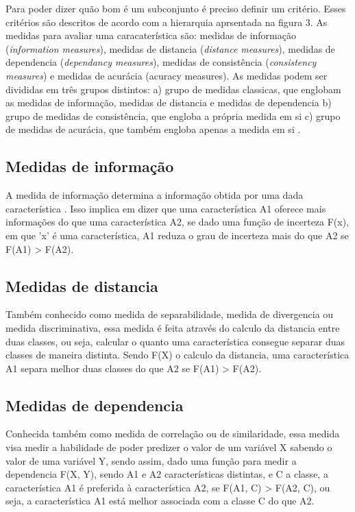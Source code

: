 Para poder dizer quão bom é um subconjunto é preciso definir um critério. Esses critérios são descritos de acordo com a hierarquia aprsentada na figura 3. As medidas para avaliar uma caracaterística são: medidas de informação (\textit{information measures}), medidas de distancia (\textit{distance measures}), medidas de dependencia (\textit{dependancy measures}), medidas de consistência (\textit{consistency measures}) e medidas de acurácia ({acuracy measures}). \cite{liu_2005, huan_1998} As medidas podem ser divididas em três grupos distintos: a) grupo de medidas classicas, que englobam as medidas de informação, medidas de distancia e medidas de dependencia b) grupo de medidas de consistência, que engloba a própria medida em si c) grupo de medidas de acurácia, que também engloba apenas a medida em si \cite{huan_1998}.

\subsection{Medidas de informação}

A medida de informação determina a informação obtida por uma dada característica \cite{liu_2005}. Isso implica em dizer que uma característica A1 oferece mais informações do que uma característica A2, se dado uma função de incerteza F(x), em que 'x' é uma característica, A1 reduza o grau de incerteza mais do que A2 se F(A1) > F(A2).

\subsection{Medidas de distancia}

Também conhecido como medida de separabilidade, medida de divergencia ou medida discriminativa, essa medida é feita através do calculo da distancia entre duas classes, ou seja, calcular o quanto uma característica consegue  separar duas classes de maneira distinta. Sendo F(X) o calculo da distancia, uma característica A1 separa melhor duas classes do que A2 se F(A1) > F(A2). \cite{huan_1998}

\subsection{Medidas de dependencia}

Conhecida também como medida de correlação ou de similaridade, essa medida visa medir a habilidade de poder predizer o valor de um variável X sabendo o valor de uma variável Y, sendo assim, dado uma função para medir a dependencia F(X, Y), sendo A1 e A2 características distintas, e C a classe, a característica A1 é preferida à característica A2, se F(A1, C) > F(A2, C), ou seja, a característica A1 está melhor associada com a classe C do que A2. \cite{huan_1998, liu_2005}

